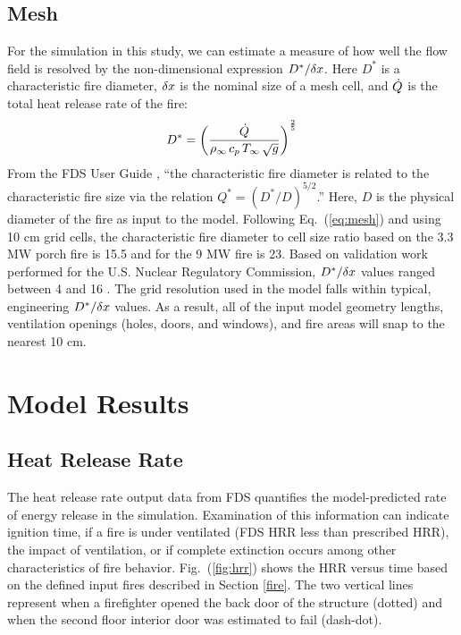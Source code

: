 \documentclass[11pt,oneside]{book}
\begin{document}
\section{Mesh}
\label{mesh}

For the simulation in this study, we can estimate a measure of how well the flow field is resolved by the non-dimensional expression $D^*/\delta x$. Here $D^*$ is a characteristic fire diameter, $\delta x$ is the nominal size of a mesh cell, and $\dot{Q}$ is the total heat release rate of the fire:
\begin{equation}
D^* = \left(
     \frac{\dot{Q}}{\rho_\infty \, c_p \, T_\infty \, \sqrt{g} }
     \right)^\frac{2}{5} 
\label{eq:mesh}
\end{equation}   
From the FDS User Guide \cite{FDS_Users_Guide}, ``the characteristic fire diameter is related to the characteristic fire size via the
relation $Q^* = (D^*/D)^{5/2}$.'' Here, $D$ is the physical diameter of the fire as input to the model. Following Eq.~(\ref{eq:mesh}) and using 10 cm grid cells, the characteristic fire diameter to cell size ratio based on the 3.3 MW porch fire is 15.5 and for the 9 MW fire is 23. Based on validation work performed for the U.S. Nuclear Regulatory Commission, $D^*/\delta x$ values ranged between 4 and 16 \cite{NUREG_1824}. The grid resolution used in the model falls within typical, engineering $D^*/\delta x$ values. As a result, all of the input model geometry lengths, ventilation openings (holes, doors, and windows), and fire areas will snap to the nearest 10 cm.

\chapter{Model Results}

\section{Heat Release Rate}
\label{HRR}
The heat release rate output data from FDS quantifies the model-predicted rate of energy release in the simulation. Examination of this information can indicate ignition time, if a fire is under ventilated (FDS HRR less than prescribed HRR), the impact of ventilation, or if complete extinction occurs among other characteristics of fire behavior. Fig.~(\ref{fig:hrr}) shows the HRR versus time based on the defined input fires described in Section \ref{fire}. The two vertical lines represent when a firefighter opened the back door of the structure (dotted) and when the second floor interior door was estimated to fail (dash-dot).
\end{document}
